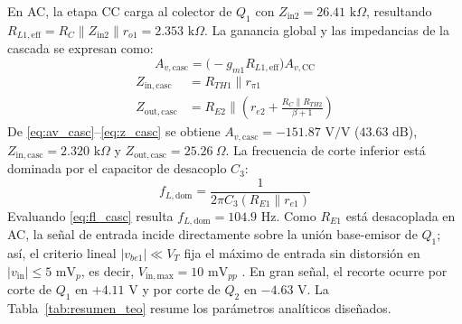 \documentclass[conference]{IEEEtran}
\begin{document}
En AC, la etapa CC carga al colector de $Q_1$ con $Z_{\mathrm{in2}} = 26.41\text{ k}\Omega$, resultando $R_{L1,\mathrm{eff}} = R_C \parallel Z_{\mathrm{in2}} \parallel r_{o1} = 2.353\text{ k}\Omega$. La ganancia global y las impedancias de la cascada se expresan como:
\begin{equation}
A_{v,\mathrm{casc}} = \bigl(-g_{m1} R_{L1,\mathrm{eff}}\bigr) A_{v,\mathrm{CC}}
\label{eq:av_casc}
\end{equation}
\begin{equation}
\begin{aligned}
Z_{\mathrm{in,casc}} &= R_{TH1} \parallel r_{\pi 1} \\
Z_{\mathrm{out,casc}} &= R_{E2} \parallel \!\left(r_{e2} + \frac{R_C \parallel R_{TH2}}{\beta + 1}\right)
\end{aligned}
\label{eq:z_casc}
\end{equation}
De \eqref{eq:av_casc}--\eqref{eq:z_casc} se obtiene $A_{v,\mathrm{casc}} = -151.87\text{ V/V}$ ($43.63\text{ dB}$), $Z_{\mathrm{in,casc}} = 2.320\text{ k}\Omega$ y $Z_{\mathrm{out,casc}} = 25.26\ \Omega$. La frecuencia de corte inferior est\'a dominada por el capacitor de desacoplo $C_3$:
\begin{equation}
f_{L,\mathrm{dom}} = \frac{1}{2\pi C_3 (R_{E1} \parallel r_{e1})}
\label{eq:fl_casc}
\end{equation}
Evaluando \eqref{eq:fl_casc} resulta $f_{L,\mathrm{dom}} = 104.9\text{ Hz}$. Como $R_{E1}$ est\'a desacoplada en AC, la se\~nal de entrada incide directamente sobre la uni\'on base-emisor de $Q_1$; as\'i, el criterio lineal $|v_{be1}| \ll V_T$ fija el m\'aximo de entrada sin distorsi\'on en $|v_{\mathrm{in}}| \le 5\text{ mV}_p$, es decir, $V_{\mathrm{in,max}} = 10\text{ mV}_{pp}$ \cite{sedra2020}. En gran se\~nal, el recorte ocurre por corte de $Q_1$ en $+4.11\text{ V}$ y por corte de $Q_2$ en $-4.63\text{ V}$. La Tabla~\ref{tab:resumen_teo} resume los par\'ametros anal\'iticos dise\~nados.
\end{document}
